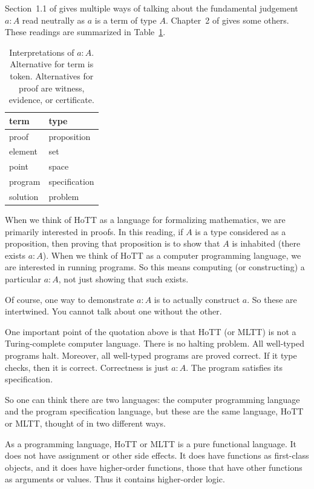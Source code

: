 \documentclass[11pt]{article}
\begin{document}
Section~1.1 of  gives multiple ways of talking about
the fundamental judgement $a : A$ read neutrally as $a$ is a term of type $A$.
Chapter~2 of \citet{programming-mltt} gives some others.
These readings are summarized in Table~\ref{tab:ways}.
\begin{table}
\caption{Interpretations of $a : A$.  Alternative for term is token.
  Alternatives for proof are witness, evidence, or certificate.}
\label{tab:ways}
\begin{center}
\begin{tabular}{ll}
term & type \\
\hline
proof & proposition \\
element & set \\
point & space \\
program & specification \\
solution & problem
\end{tabular}
\end{center}
\end{table}

When we think of HoTT as a language for formalizing mathematics, we are
primarily interested in proofs.  In this reading, if $A$ is a type considered
as a proposition, then proving that proposition is to show that $A$ is
inhabited (there exists $a : A$).
When we think of HoTT as a computer programming language, we are interested
in running programs.  So this means computing (or constructing) a particular
$a : A$, not just showing that such exists.

Of course, one way to demonstrate $a : A$ is to actually construct $a$.
So these are intertwined.  You cannot talk about one without the other.

One important point of the quotation above is that HoTT (or MLTT) is not
a Turing-complete computer language.  There is no halting problem.
All well-typed programs halt.  Moreover, all well-typed programs are
proved correct.  If it type checks, then it is correct.  Correctness is
just $a : A$.   The program satisfies its specification.

So one can think there are two languages: the computer programming language
and the program specification language, but these are the same language, HoTT
or MLTT, thought of in two different ways.

As a programming language, HoTT or MLTT is a pure functional language.
It does not have assignment or other side effects.  It does have functions
as first-class objects, and it does have higher-order functions, those that
have other functions as arguments or values.  Thus it contains higher-order
logic.
\end{document}
